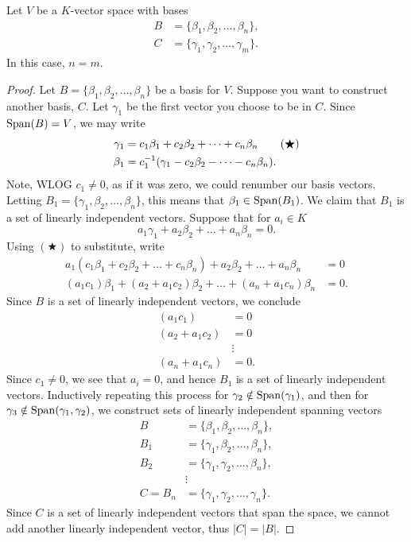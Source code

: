 \documentclass{ximera}
\begin{document}
\begin{theorem}
  Let $V$ be a $K$-vector space with bases
  \begin{align*}
    B &= \{\beta_1,\beta_2,\dots, \beta_n\}, \\
    C &= \{\gamma_1,\gamma_2, \dots, \gamma_m\}.
  \end{align*}
  In this case, $n = m$.
  \begin{proof}
    Let $B= \{\beta_1,\beta_2,\dots, \beta_n\}$ be a basis for $V$.
    Suppose you want to construct another basis, $C$.  Let $\gamma_1$
    be the first vector you choose to be in $C$. Since $\operatorname{Span}(B) = V$,
    we may write
    \begin{align}
      \gamma_1 &= c_1\beta_1 + c_2\beta_2 + \dots + c_n\beta_n \tag{$\bigstar$}\\
      \beta_1 &= c_1^{-1}(\gamma_1 -  c_2\beta_2 - \dots - c_n\beta_n).\notag
    \end{align}
    Note, WLOG $c_1 \ne 0$, as if it was zero, we could renumber our
    basis vectors.  Letting $B_1 = \{\gamma_1, \beta_2,\dots,
    \beta_n\}$, this means that $\beta_1\in \operatorname{Span}(B_1)$. We claim that
    $B_1$ is a set of linearly independent vectors. Suppose that for
    $a_i\in K$
    \[
    a_1 \gamma_1 + a_2 \beta_2 + \dots + a_n \beta_n = 0.
    \]
    Using $(\bigstar)$ to substitute, write
    \begin{align*}
      a_1(c_1\beta_1 + c_2\beta_2 + \dots + c_n\beta_n) + a_2 \beta_2 + \dots + a_n \beta_n &= 0\\
      (a_1c_1) \beta_1 + (a_2+a_1c_2)\beta_2 + \dots + (a_n+a_1c_n)\beta_n &= 0.
    \end{align*}
    Since $B$ is a set of linearly independent vectors, we conclude
    \begin{align*}
      (a_1c_1) &=0\\
      (a_2+a_1c_2) &=0\\
      &\vdots \\      
      (a_n+a_1c_n) &=0.
    \end{align*}
    Since $c_1\ne 0$, we see that $a_i = 0$, and hence $B_1$ is a set
    of linearly independent vectors. Inductively repeating this
    process for $\gamma_2\notin \operatorname{Span}(\gamma_1)$, and then for
    $\gamma_3 \notin \operatorname{Span}(\gamma_1,\gamma_2)$, we construct sets of
    linearly independent spanning vectors
    \begin{align*}
      B &= \{\beta_1,\beta_2,\dots,\beta_n\},\\
      B_1 &= \{\gamma_1,\beta_2,\dots,\beta_n\},\\
      B_2 &= \{\gamma_1,\gamma_2,\dots,\beta_n\},\\
      &\vdots \\
      C = B_n &= \{\gamma_1,\gamma_2,\dots,\gamma_n\}.
    \end{align*}
    Since $C$ is a set of linearly independent vectors that span the
    space, we cannot add another linearly independent vector, thus
    $|C| = |B|$.
  \end{proof}
\end{theorem}
\end{document}
